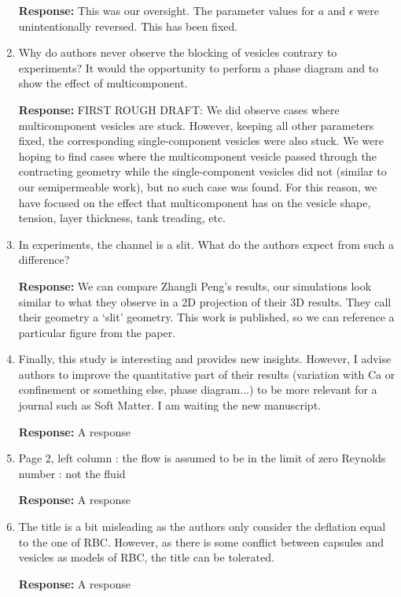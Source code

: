\documentclass[11pt]{article}
\begin{document}
\begin{enumerate}
\noindent
{\bf Response:} This was our oversight. The parameter values for $a$ and
$\epsilon$ were unintentionally reversed. This has been fixed.

\item Why do authors never observe the blocking of vesicles contrary to
  experiments? It would the opportunity to perform a phase diagram and
    to show the effect of multicomponent.

\noindent
{\bf Response:} FIRST ROUGH DRAFT: We did observe cases where
    multicomponent vesicles are stuck. However, keeping all other
    parameters fixed, the corresponding single-component vesicles were
    also stuck. We were hoping to find cases where the multicomponent
    vesicle passed through the contracting geometry while the
    single-component vesicles did not (similar to our semipermeable
    work), but no such case was found.  For this reason, we have focused
    on the effect that multicomponent has on the vesicle shape, tension,
    layer thickness, tank treading, etc.


\item In experiments, the channel is a slit. What do the authors expect
  from such a difference?

\noindent
{\bf Response:} We can compare Zhangli Peng's results, our simulations
look similar to what they observe in a 2D projection of their 3D
results. They call their geometry a `slit' geometry. This work is
published, so we can reference a particular figure from the paper.

\item Finally, this study is interesting and provides new insights.
  However, I advise authors to improve the quantitative part of their
  results (variation with Ca or confinement or something else, phase
  diagram...) to be more relevant for a journal such as Soft Matter. I
  am waiting the new manuscript.

\noindent
{\bf Response:} A response

\item Page 2, left column : the flow is assumed to be in the limit of
  zero Reynolds number : not the fluid

\noindent
{\bf Response:} A response

\item The title is a bit misleading as the authors only consider the
  deflation equal to the one of RBC. However, as there is some conflict
  between capsules and vesicles as models of RBC, the title can be
  tolerated.

\noindent
{\bf Response:} A response
\end{enumerate}
\end{document}
